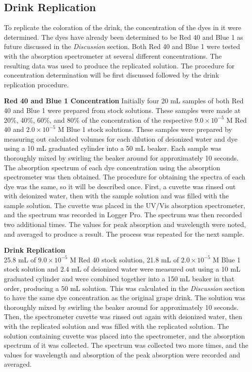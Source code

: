 \documentclass[12pt]{article}
\begin{document}
\subsection*{Drink Replication}
To replicate the coloration of the drink, the concentration of the dyes in it were determined. The dyes have already been determined to be Red 40 and Blue 1 as future discussed in the \textit{Discussion} section. Both Red 40 and Blue 1 were tested with the absorption spectrometer at several different concentrations. The resulting data was used to produce the replicated solution. The procedure for concentration determination will be first discussed followed by the drink replication procedure.

\vspace{6pt}\textbf{Red 40 and Blue 1 Concentration}
Initially four 20 mL samples of both Red 40 and Blue 1 were prepared from stock solutions. These samples were made at 20\%, 40\%, 60\%, and 80\% of the concentration of the respective $9.0 \times 10^{-5}$ M Red 40 and $2.0 \times 10^{-5}$ M Blue 1 stock solutions. These samples were prepared by measuring out calculated volumes for each dilution of deionized water and dye using a 10 mL graduated cylinder into a 50 mL beaker. Each sample was thoroughly mixed by swirling the beaker around for approximately 10 seconds. The absorption spectrum of each dye concentration using the absorption spectrometer was then obtained. The procedure for obtaining the spectra of each dye was the same, so it will be described once. First, a cuvette was rinsed out with deionized water, then with the sample solution and was filled with the sample solution. The cuvette was placed in the UV/Vis absorption spectrometer, and the spectrum was recorded in Logger Pro. The spectrum was then recorded two additional times. The values for peak absorption and wavelength were noted, and averaged to produce a result. The process was repeated for the next sample.

\vspace{6pt}\textbf{Drink Replication}\\
25.8 mL of $9.0 \times 10^{-5}$ M Red 40 stock solution, 21.8 mL of $2.0 \times 10^{-5}$ M Blue 1 stock solution and 2.4 mL of deionized water were measured out using a 10 mL graduated cylinder and were combined together into a 150 mL beaker in that order, producing a 50 mL solution. This was calculated in the \textit{Discussion} section to have the same dye concentration as the original grape drink. The solution was thoroughly mixed by swirling the beaker around for approximately 10 seconds. Then, the spectrometer cuvette was rinsed out again with deionized water, then with the replicated solution and was filled with the replicated solution. The solution containing cuvette was placed into the spectrometer, and the absorption spectrum of it was collected. The spectrum was collected two more times, and the values for wavelength and absorption of the peak absorption were recorded and averaged.
\pagebreak
\end{document}
